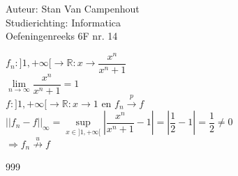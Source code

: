 \documentclass[a4paper]{article}
\begin{document}
  
\noindent \large Auteur: Stan Van Campenhout \\
\noindent \large Studierichting:  Informatica\\
\noindent \large Oefeningenreeks 6F nr. 14\\

\medskip

\normalsize

$ f_n : ]1, +\infty[ \rightarrow \mathbb{R}  : x \rightarrow \dfrac{x^n}{x^n + 1} $\\

$ \lim\limits_{n \rightarrow \infty}\dfrac{x^n}{x^n + 1} = 1 $\\

$ f : ]1, +\infty[ \rightarrow \mathbb{R} : x \rightarrow 1 \text{ en } f_n \stackrel{p}{\rightarrow} f $\\

$ \left|\left|f_n - f\right|\right|_{\infty} = \sup\limits_{x \in  ]1, +\infty[}\left|\dfrac{x^n}{x^n + 1} - 1 \right| = \left|\dfrac{1}{2} - 1 \right| = \dfrac{1}{2} \neq 0 $\\

$ \Rightarrow f_n \stackrel{u}{\not\rightarrow} f $\\

\begin{thebibliography}{999}
\end{thebibliography}
\end{document}
